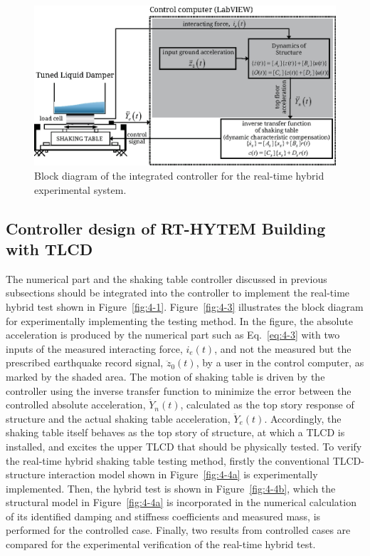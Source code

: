 \begin{figure}[ht]
\centering
\includegraphics[scale =1] {figure/3-3.eps}
\caption{Block diagram of the integrated controller for the real-time hybrid experimental system.}
\label{fig:3-3}
\end{figure}









\subsection{Controller design of RT-HYTEM Building with TLCD}
The numerical part and the shaking table controller discussed in previous subsections should be integrated into the controller to implement the real-time hybrid test shown in Figure~\ref{fig:4-1}. Figure~\ref{fig:4-3} illustrates the block diagram for experimentally implementing the testing method. In the figure, the absolute acceleration is produced by the numerical part such as Eq.~\eqref{eq:4-3} with two inputs of the measured interacting force, $i_{e}(t)$, and not the measured but the prescribed earthquake record signal, $\ddot{z}_{0}(t)$, by a user in the control computer, as marked by the shaded area. The motion of shaking table is driven by the controller using the inverse transfer function to minimize the error between the controlled absolute acceleration, $\ddot{Y}_{n}(t)$, calculated as the top story response of structure and the actual shaking table acceleration, $\ddot{Y}_{e}(t)$. Accordingly, the shaking table itself behaves as the top story of structure, at which a TLCD is installed, and excites the upper TLCD that should be physically tested.
To verify the real-time hybrid shaking table testing method, firstly the conventional TLCD-structure interaction model shown in Figure~\ref{fig:4-4a} is experimentally implemented. Then, the hybrid test is shown in Figure~\ref{fig:4-4b}, which the structural model in Figure~\ref{fig:4-4a} is incorporated in the numerical calculation of its identified damping and stiffness coefficients and measured mass, is performed for the controlled case. Finally, two results from controlled cases are compared for the experimental verification of the real-time hybrid test.

